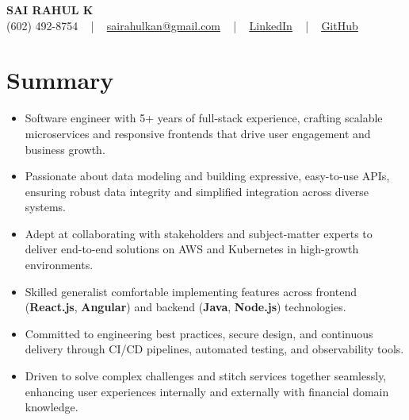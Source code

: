 \documentclass[letterpaper,11pt]{article}
\newcommand{\resumeItem}[1]{
  \item\footnotesize{
    {#1 \vspace{-2pt}}
  }
}
\newcommand{\resumeItemListStart}{\begin{itemize}[leftmargin=*]}
\newcommand{\resumeItemListEnd}{\end{itemize}\vspace{-5pt}}
\begin{document}
\begin{center}
    {\fontsize{14pt}{12pt}\selectfont \textbf{\MakeUppercase{Sai Rahul K}}}\\ \vspace{2pt}
    \fontsize{10pt}{12pt}\selectfont (602) 492-8754 ~ | ~ \href{mailto:sairahulkan@gmail.com}{sairahulkan@gmail.com} ~ | ~
    \href{https://www.linkedin.com/in/rq123/}{\color{blue}\underline{LinkedIn}} ~ | ~
    \href{https://github.com/kanrahuldo}{\color{blue}\underline{GitHub}}~
    \vspace{-8pt}
\end{center}

\section{Summary}
\fontsize{9pt}{10pt}\selectfont
\resumeItemListStart
    \resumeItem{Software engineer with 5+ years of full-stack experience, crafting scalable microservices and responsive frontends that drive user engagement and business growth.}
    \resumeItem{Passionate about data modeling and building expressive, easy-to-use APIs, ensuring robust data integrity and simplified integration across diverse systems.}
    \resumeItem{Adept at collaborating with stakeholders and subject-matter experts to deliver end-to-end solutions on AWS and Kubernetes in high-growth environments.}
    \resumeItem{Skilled generalist comfortable implementing features across frontend (\textbf{React.js}, \textbf{Angular}) and backend (\textbf{Java}, \textbf{Node.js}) technologies.}
    \resumeItem{Committed to engineering best practices, secure design, and continuous delivery through CI/CD pipelines, automated testing, and observability tools.}
    \resumeItem{Driven to solve complex challenges and stitch services together seamlessly, enhancing user experiences internally and externally with financial domain knowledge.}
\resumeItemListEnd
\vspace{-6pt}
\end{document}
